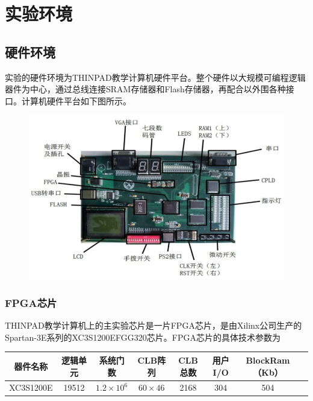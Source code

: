 
\chapter{实验环境} %

\label{Chapter2} %


\section{硬件环境}

实验的硬件环境为THINPAD教学计算机硬件平台。整个硬件以大规模可编程逻辑器件为中心，通过总线连接SRAM存储器和Flash存储器，再配合以外围各种接口。计算机硬件平台如下图所示。
\begin{figure}[H]
  \centering
  \includegraphics[width=5in]{Figures/THINPAD.png}
\end{figure}

\subsection{FPGA芯片}
THINPAD教学计算机上的主实验芯片是一片FPGA芯片，是由Xilinx公司生产的Spartan-3E系列的XC3S1200EFGG320芯片。FPGA芯片的具体技术参数为
\begin{center}
\footnotesize
\begin{tabular}{|c|c|c|c|c|c|c|c|}
\hline
器件名称 & 逻辑单元 & 系统门数 & CLB阵列 & CLB总数 & 用户I/O & BlockRam（Kb）\\\hline
XC3S1200E & 19512 & $1.2\times 10^6$ & $60\times 46$ & 2168 & 304 & 504\\\hline
\end{tabular}
\end{center}

